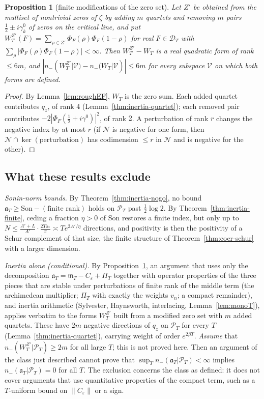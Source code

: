 \documentclass[11pt]{amsart}
\newtheorem{proposition}[theorem]{Proposition}
\theoremstyle{definition}
\theoremstyle{remark}
\newcommand{\PT}{\mathcal P_T}
\newcommand{\PiT}{\Pi_T}
\newcommand{\mT}{\mathfrak m_T}
\begin{document}
\begin{proposition}[finite modifications of the zero set]\label{thm:inertia-rank}
Let $Z'$ be obtained from the multiset of nontrivial zeros of $\zeta$ by adding $m$ quartets and removing $m$ pairs
$\frac12\pm i\gamma^0_k$ of zeros on the critical line, and put $W^{Z'}_T(F)=\sum_{\rho\in Z'}\Phi_F(\rho)\Phi_F(1-\rho)$ for
real $F\in\mathcal D_T$ with $\sum_\rho|\Phi_F(\rho)\Phi_F(1-\rho)|<\infty$. Then $W^{Z'}_T-W_T$ is a real quadratic form of rank
$\le6m$, and $|n_-(W^{Z'}_T|\mathcal V)-n_-(W_T|\mathcal V)|\le6m$ for every subspace $\mathcal V$ on which both forms are defined.
\end{proposition}
\begin{proof}
By Lemma~\ref{lem:roughEF}, $W_T$ is the zero sum. Each added quartet contributes $q_z$, of rank $4$
(Lemma~\ref{thm:inertia-quartet}); each removed pair contributes $-2|\Phi_F(\frac12+i\gamma^0)|^2$, of rank $2$. A
perturbation of rank $r$ changes the negative index by at most $r$ (if $\mathcal N$ is negative for one form, then
$\mathcal N\cap\ker(\text{perturbation})$ has codimension $\le r$ in $\mathcal N$ and is negative for the other).
\end{proof}

\subsection{What these results exclude}\label{subsec:inertia-excl}
\emph{Sonin-norm bounds.} By Theorem~\ref{thm:inertia-nogo}, no bound $\mathfrak a_T\ge\mathrm{Son}-(\text{finite rank})$
holds on $\PT$ past $\frac12\log2$. By Theorem~\ref{thm:inertia-finite}, ceding a fraction $\eta>0$ of $\mathrm{Son}$
restores a finite index, but only up to $N\le\frac{A'+L}{A'}\cdot\frac{2Ts_*}\pi\asymp Te^{2A'/\eta}$ directions, and
positivity is then the positivity of a Schur complement of that size, the finite structure of
Theorem~\ref{thm:coer-schur} with a larger dimension.

\emph{Inertia alone (conditional).} By Proposition~\ref{thm:inertia-rank}, an argument that uses only the decomposition
$\mathfrak a_T=\mT-C_\varepsilon+\PiT$ together with operator properties of the three pieces that are stable under
perturbations of finite rank of the middle term (the archimedean multiplier; $\PiT$ with exactly the weights $v_n$;
a compact remainder), and inertia arithmetic (Sylvester, Haynsworth, interlacing, Lemma~\ref{lem:monoT}), applies
verbatim to the forms $W^{Z'}_T$ built from a modified zero set with $m$ added quartets. These have $2m$
negative directions of $q_z$ on $\PT$ for every $T$ (Lemma~\ref{thm:inertia-quartet}), carrying weight of order
$e^{2\beta T}$. \emph{Assume} that $n_-(W^{Z'}_T|\PT)\ge2m$ for all large $T$; this is not proved here. Then an argument
of the class just described cannot prove that $\sup_Tn_-(\mathfrak a_T|\PT)<\infty$ implies $n_-(\mathfrak a_T|\PT)=0$ for all
$T$. The exclusion concerns the class as defined: it does not cover arguments that use quantitative properties of
the compact term, such as a $T$-uniform bound on $\|C_\varepsilon\|$ or a sign.
\end{document}
